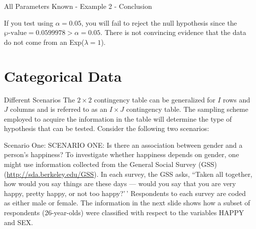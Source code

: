 \documentclass[
  ignorenonframetext,
]{beamer}
\begin{document}
\begin{frame}{All Parameters Known - Example 2 - Conclusion}
\label{all-parameters-known---example-2---conclusion}
\begin{tcolorbox}
If you test using $\alpha = 0.05$, you will fail to reject the null hypothesis since the $\wp\text{-value}= 0.0599978  > \alpha = 0.05$.  There is not convincing evidence that the data do not come from an Exp($\lambda = 1$).
\end{tcolorbox}
\end{frame}

\section{Categorical Data}\label{categorical-data}

\begin{frame}{Different Scenarios}
\label{different-scenarios}
The \(2 \times 2\) contingency table can be generalized for \(I\) rows
and \(J\) columns and is referred to as an \(I \times J\) contingency
table. The sampling scheme employed to acquire the information in the
table will determine the type of hypothesis that can be tested. Consider
the following two scenarios:
\end{frame}

\begin{frame}{Scenario One:}
\label{scenario-one}
SCENARIO ONE: Is there an association between gender and a person's
happiness? To investigate whether happiness depends on gender, one might
use information collected from the General Social Survey (GSS)
(\href{http://sda.berkeley.edu/GSS}{http://sda.berkeley.edu/GSS}). In
each survey, the GSS asks, ``Taken all together, how would you say
things are these days --- would you say that you are very happy, pretty
happy, or not too happy?'\,' Respondents to each survey are coded as
either male or female. The information in the next slide shows how a
subset of respondents (26-year-olds) were classified with respect to the
variables HAPPY and SEX.
\end{frame}
\end{document}
